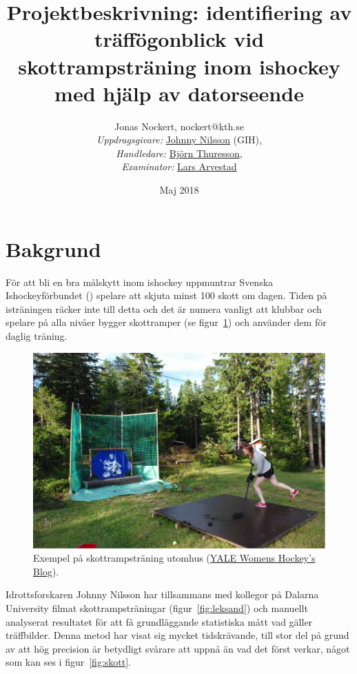 \documentclass[a4paper,12pt]{article}
\title{Projektbeskrivning: identifiering av träffögonblick vid
  skottrampsträning inom ishockey med hjälp av datorseende}
\author{Jonas Nockert, nockert@kth.se
\\[0.5cm]{
  \small \textit{Uppdragsgivare:}
  \href{http://www.gih.se/Personal/Johnny-Nilsson/}{Johnny Nilsson} (GIH),\\
  \small \textit{Handledare:}
  \href{https://www.kth.se/profile/thure}{Björn Thuresson},\\
  \small \textit{Examinator:}
  \href{http://staff.math.su.se/arve/}{Lars Arvestad}
}}%
\date{\small Maj 2018}
\begin{document}
\maketitle

\section*{Bakgrund}
För att bli en bra målskytt inom ishockey uppmuntrar Svenska Ishockeyförbundet
(\citeyear{Swehockey:2016}) spelare att skjuta minst 100 skott om dagen. Tiden
på isträningen räcker inte till detta och det är numera vanligt att klubbar
och spelare på alla nivåer bygger skottramper (se figur~\ref{fig:skottramp})
och använder dem för daglig träning.

\begin{figure}[ht]
  \centering
  \includegraphics[width=\linewidth]{photos/the-incredible-shooting-ramp-my-mom-built-for-me.png}
  \caption{Exempel på skottrampsträning utomhus
  (\href{https://yalewomenshockey.wordpress.com/2013/07/18/ywih-summer-blog-hanna-astrom/}{YALE Womens Hockey's Blog}).
  \label{fig:skottramp}}
\end{figure}

Idrottsforskaren Johnny Nilsson har tillsammans med kollegor på Dalarna
University filmat skottrampsträningar (figur~\ref{fig:leksand}) och manuellt
analyserat resultatet för att få grundläggande statistiska mått vad gäller
träffbilder. Denna metod har visat sig mycket tidskrävande, till stor del
på grund av att hög precision är betydligt svårare att uppnå än vad det först
verkar, något som kan ses i figur~\ref{fig:skott}.
\end{document}
